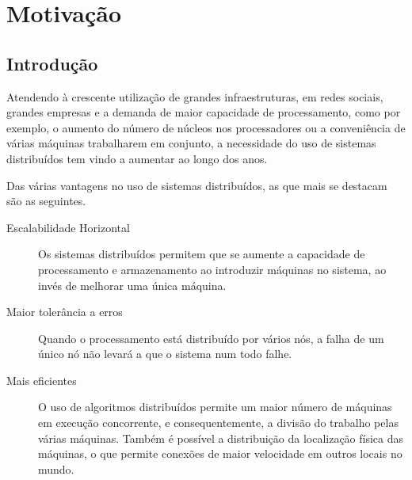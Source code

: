 \chapter{Motivação}
\label{chap:motivacao}

\section{Introdução}
\label{motivacao:sec:introducao}



Atendendo à crescente utilização de grandes infraestruturas, em redes sociais, grandes empresas e a demanda de maior capacidade de processamento, como por exemplo, o aumento do número de núcleos nos processadores ou a conveniência de várias máquinas trabalharem em conjunto, a necessidade do uso de sistemas distribuídos tem vindo a aumentar ao longo dos anos.

Das várias vantagens no uso de sistemas distribuídos, as que mais se destacam são as seguintes.
\begin{description}
    \item [Escalabilidade Horizontal] Os sistemas distribuídos permitem que se aumente a capacidade de processamento e armazenamento ao introduzir máquinas no sistema, ao invés de melhorar uma única máquina.
	
    \item [Maior tolerância a erros]Quando o processamento está distribuído por vários nós, a falha de um único nó não levará a que o sistema num todo falhe.

    \item [Mais eficientes] O uso de algoritmos distribuídos permite um maior número de máquinas em execução concorrente, e consequentemente, a divisão do trabalho pelas várias máquinas.
	Também é possível a distribuição da localização física das máquinas, o que permite conexões de maior velocidade em outros locais no mundo.

\end{description}

